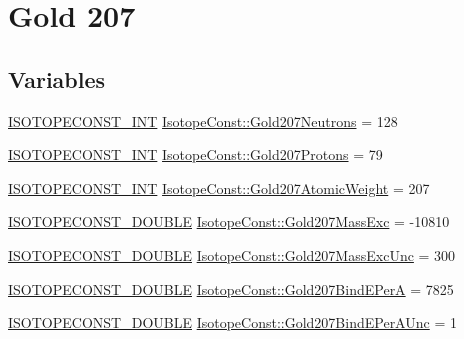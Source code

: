 \hypertarget{group___isotope_const-_gold-_au207}{}\section{Gold 207}
\label{group___isotope_const-_gold-_au207}
\subsection*{Variables}
\begin{DoxyCompactItemize}
\item 
\mbox{\hyperlink{group___isotope_const-_macros_ga5f18360b3e99483a35c32d789e62621c}{I\+S\+O\+T\+O\+P\+E\+C\+O\+N\+S\+T\+\_\+\+I\+NT}} \mbox{\hyperlink{group___isotope_const-_gold-_au207_gaf246c38352185b1ca314b5da893e6a57}{Isotope\+Const\+::\+Gold207\+Neutrons}} = 128
\item 
\mbox{\hyperlink{group___isotope_const-_macros_ga5f18360b3e99483a35c32d789e62621c}{I\+S\+O\+T\+O\+P\+E\+C\+O\+N\+S\+T\+\_\+\+I\+NT}} \mbox{\hyperlink{group___isotope_const-_gold-_au207_gab27fdd511ed7987bd8bc5f9f974abc43}{Isotope\+Const\+::\+Gold207\+Protons}} = 79
\item 
\mbox{\hyperlink{group___isotope_const-_macros_ga5f18360b3e99483a35c32d789e62621c}{I\+S\+O\+T\+O\+P\+E\+C\+O\+N\+S\+T\+\_\+\+I\+NT}} \mbox{\hyperlink{group___isotope_const-_gold-_au207_gae40a2a94ea5c21a95b56f222ecaa6cfb}{Isotope\+Const\+::\+Gold207\+Atomic\+Weight}} = 207
\item 
\mbox{\hyperlink{group___isotope_const-_macros_ga8f45a7272ce02c0b4c65c44636ed719a}{I\+S\+O\+T\+O\+P\+E\+C\+O\+N\+S\+T\+\_\+\+D\+O\+U\+B\+LE}} \mbox{\hyperlink{group___isotope_const-_gold-_au207_ga613c265a2efb80184ae741882fe1d490}{Isotope\+Const\+::\+Gold207\+Mass\+Exc}} = -\/10810
\item 
\mbox{\hyperlink{group___isotope_const-_macros_ga8f45a7272ce02c0b4c65c44636ed719a}{I\+S\+O\+T\+O\+P\+E\+C\+O\+N\+S\+T\+\_\+\+D\+O\+U\+B\+LE}} \mbox{\hyperlink{group___isotope_const-_gold-_au207_ga7bf8f3cfda83e6eb8fccfe9e6aa3a63f}{Isotope\+Const\+::\+Gold207\+Mass\+Exc\+Unc}} = 300
\item 
\mbox{\hyperlink{group___isotope_const-_macros_ga8f45a7272ce02c0b4c65c44636ed719a}{I\+S\+O\+T\+O\+P\+E\+C\+O\+N\+S\+T\+\_\+\+D\+O\+U\+B\+LE}} \mbox{\hyperlink{group___isotope_const-_gold-_au207_gabdaa5ca1a8915680c9efff11c3d6a35f}{Isotope\+Const\+::\+Gold207\+Bind\+E\+PerA}} = 7825
\item 
\mbox{\hyperlink{group___isotope_const-_macros_ga8f45a7272ce02c0b4c65c44636ed719a}{I\+S\+O\+T\+O\+P\+E\+C\+O\+N\+S\+T\+\_\+\+D\+O\+U\+B\+LE}} \mbox{\hyperlink{group___isotope_const-_gold-_au207_ga466e0dc6c68bb804122a4767d4aec96d}{Isotope\+Const\+::\+Gold207\+Bind\+E\+Per\+A\+Unc}} = 1

\end{DoxyCompactItemize}
